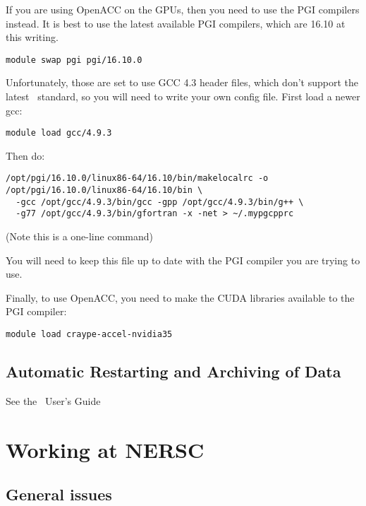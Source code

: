 If you are using OpenACC on the GPUs, then you need to use the PGI
compilers instead.  It is best to use the latest available PGI
compilers, which are 16.10 at this writing.  
\begin{verbatim}
module swap pgi pgi/16.10.0
\end{verbatim}

Unfortunately, those are set to use GCC 4.3 header files, which don't
support the latest \cpp\ standard, so you will need to write your
own config file.  First load a newer gcc:
\begin{verbatim}
module load gcc/4.9.3
\end{verbatim}

Then do:
\begin{verbatim}
/opt/pgi/16.10.0/linux86-64/16.10/bin/makelocalrc -o /opt/pgi/16.10.0/linux86-64/16.10/bin \
  -gcc /opt/gcc/4.9.3/bin/gcc -gpp /opt/gcc/4.9.3/bin/g++ \
  -g77 /opt/gcc/4.9.3/bin/gfortran -x -net > ~/.mypgcpprc
\end{verbatim}
(Note this is a one-line command)

You will need to keep this file up to date with the PGI compiler you are trying to use.

Finally, to use OpenACC, you need to make the CUDA libraries available to the PGI compiler:
\begin{verbatim}
module load craype-accel-nvidia35
\end{verbatim}

\subsection{Automatic Restarting and Archiving of Data}

See the \maestro\ User's Guide


\section{Working at NERSC}

\subsection{General issues}




